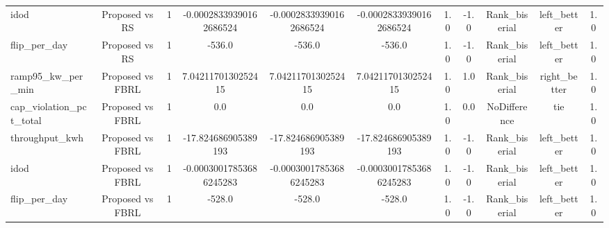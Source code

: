 \begin{table}[t]
\begin{tabular}{lcccccccccc}
idod & Proposed vs RS & 1 & -0.00028339390162686524 & -0.00028339390162686524 & -0.00028339390162686524 & 1.0 & -1.0 & Rank\_biserial & left\_better & 1.0 \\
flip\_per\_day & Proposed vs RS & 1 & -536.0 & -536.0 & -536.0 & 1.0 & -1.0 & Rank\_biserial & left\_better & 1.0 \\
ramp95\_kw\_per\_min & Proposed vs FBRL & 1 & 7.0421170130252415 & 7.0421170130252415 & 7.0421170130252415 & 1.0 & 1.0 & Rank\_biserial & right\_better & 1.0 \\
cap\_violation\_pct\_total & Proposed vs FBRL & 1 & 0.0 & 0.0 & 0.0 & 1.0 & 0.0 & NoDifference & tie & 1.0 \\
throughput\_kwh & Proposed vs FBRL & 1 & -17.824686905389193 & -17.824686905389193 & -17.824686905389193 & 1.0 & -1.0 & Rank\_biserial & left\_better & 1.0 \\
idod & Proposed vs FBRL & 1 & -0.00030017853686245283 & -0.00030017853686245283 & -0.00030017853686245283 & 1.0 & -1.0 & Rank\_biserial & left\_better & 1.0 \\
flip\_per\_day & Proposed vs FBRL & 1 & -528.0 & -528.0 & -528.0 & 1.0 & -1.0 & Rank\_biserial & left\_better & 1.0 \\
\bottomrule
\end{tabular}
\end{table}